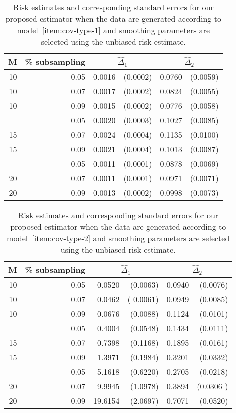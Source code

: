 \documentclass[12pt]{article}
\theoremstyle{definition}
\begin{document}
\begin{table}[H] \label{table:simulation-2-sigma-1}
\centering
\begin{tabular}{rrrrrr}
M & \% subsampling &  \multicolumn{2}{c}{$\hat{\Delta}_1$}  &  \multicolumn{2}{c}{$\hat{\Delta}_2$} \\ 
  \hline
10 & 0.05 & 0.0016 & (0.0002) & 0.0760 & (0.0059) \\ 
  10 & 0.07 & 0.0017 & (0.0002) & 0.0824 & (0.0055) \\ 
  10 & 0.09 & 0.0015 & (0.0002) & 0.0776 & (0.0058) \\ 
    \hdashline
  15 & 0.05 & 0.0020 & (0.0003) & 0.1027 & (0.0085) \\ 
  15 & 0.07 & 0.0024 & (0.0004) & 0.1135 & (0.0100) \\ 
  15 & 0.09 & 0.0021 & (0.0004) & 0.1013 & (0.0087) \\ 
    \hdashline
  20 & 0.05 & 0.0011 & (0.0001) & 0.0878 & (0.0069) \\ 
  20 & 0.07 & 0.0011 & (0.0001) & 0.0971 & (0.0071) \\ 
  20 & 0.09 & 0.0013 & (0.0002) & 0.0998 & (0.0073) \\ 
   \hline
\end{tabular}
\caption{Risk estimates and corresponding standard errors for our proposed estimator when the data are generated according to model~\ref{item:cov-type-1}  and smoothing parameters are selected using the unbiased risk estimate.} 
\end{table}


\begin{table}[H] \label{table:simulation-2-sigma-2}
\centering
\begin{tabular}{rrrrrr}
M & \% subsampling &  \multicolumn{2}{c}{$\hat{\Delta}_1$}  &  \multicolumn{2}{c}{$\hat{\Delta}_2$} \\ 
  \hline
10 & 0.05 & 0.0520 & (0.0063) & 0.0940 & (0.0076) \\ 
  10 & 0.07 & 0.0462 &( 0.0061) & 0.0949 & (0.0085) \\ 
  10 & 0.09 & 0.0676 & (0.0088) & 0.1124 & (0.0101)\\ 
    \hdashline
  15 & 0.05 & 0.4004 & (0.0548) & 0.1434 & (0.0111) \\ 
  15 & 0.07 & 0.7398 & (0.1168) & 0.1895 & (0.0161) \\ 
  15 & 0.09 & 1.3971 & (0.1984) & 0.3201 & (0.0332) \\ 
    \hdashline
  20 & 0.05 & 5.1618 & (0.6220) & 0.2705 & (0.0218)\\ 
  20 & 0.07 & 9.9945 & (1.0978) & 0.3894 & (0.0306 )\\ 
  20 & 0.09 & 19.6154 & (2.0697) & 0.7071 & (0.0520) \\ 
   \hline
\end{tabular}
\caption{Risk estimates and corresponding standard errors for our proposed estimator when the data are generated according to model~\ref{item:cov-type-2}  and smoothing parameters are selected using the unbiased risk estimate.} 
\end{table}
\end{document}

